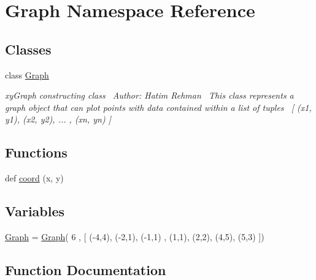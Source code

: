 \hypertarget{namespace_graph}{}\section{Graph Namespace Reference}
\label{namespace_graph}
\subsection*{Classes}
\begin{DoxyCompactItemize}
\item 
class \hyperlink{class_graph_1_1_graph}{Graph}
\begin{DoxyCompactList}\small\item\em xy\+Graph constructing class~\newline
 Author\+: Hatim Rehman~\newline
 This class represents a graph object that can plot points with data contained within a list of tuples~\newline
\mbox{[} (x1, y1), (x2, y2), ... , (xn, yn) \mbox{]} \end{DoxyCompactList}\end{DoxyCompactItemize}
\subsection*{Functions}
\begin{DoxyCompactItemize}
\item 
def \hyperlink{namespace_graph_af7871e2e7cce2b271673d8be423ba0d1}{coord} (x, y)
\end{DoxyCompactItemize}
\subsection*{Variables}
\begin{DoxyCompactItemize}
\item 
\hyperlink{namespace_graph_a233b6b041f2233754b883f7877a39fbb}{Graph} = \hyperlink{class_graph_1_1_graph}{Graph}( 6 , \mbox{[} (-\/4,4), (-\/2,1), (-\/1,1) , (1,1), (2,2), (4,5), (5,3) \mbox{]})
\end{DoxyCompactItemize}


\subsection{Function Documentation}
\hypertarget{namespace_graph_af7871e2e7cce2b271673d8be423ba0d1}{}\label{namespace_graph_af7871e2e7cce2b271673d8be423ba0d1} 
